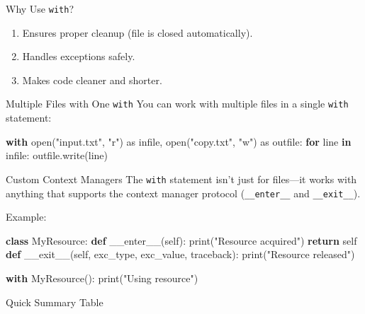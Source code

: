 \documentclass[
  letterpaper,
  DIV=11,
  numbers=noendperiod]{scrreprt}
\newenvironment{Shaded}{\begin{snugshade}}{\end{snugshade}}
\newcommand{\BuiltInTok}[1]{\textcolor[rgb]{0.00,0.23,0.31}{#1}}
\newcommand{\ControlFlowTok}[1]{\textcolor[rgb]{0.00,0.23,0.31}{\textbf{#1}}}
\newcommand{\FunctionTok}[1]{\textcolor[rgb]{0.28,0.35,0.67}{#1}}
\newcommand{\ImportTok}[1]{\textcolor[rgb]{0.00,0.46,0.62}{#1}}
\newcommand{\KeywordTok}[1]{\textcolor[rgb]{0.00,0.23,0.31}{\textbf{#1}}}
\newcommand{\NormalTok}[1]{\textcolor[rgb]{0.00,0.23,0.31}{#1}}
\newcommand{\StringTok}[1]{\textcolor[rgb]{0.13,0.47,0.30}{#1}}
\newcommand{\VariableTok}[1]{\textcolor[rgb]{0.07,0.07,0.07}{#1}}
\providecommand{\tightlist}{%
  \setlength{\itemsep}{0pt}\setlength{\parskip}{0pt}}
\begin{document}
Why Use \texttt{with}?

\begin{enumerate}
\def\labelenumi{\arabic{enumi}.}
\tightlist
\item
  Ensures proper cleanup (file is closed automatically).
\item
  Handles exceptions safely.
\item
  Makes code cleaner and shorter.
\end{enumerate}

Multiple Files with One \texttt{with} You can work with multiple files
in a single \texttt{with} statement:

\begin{Shaded}
\begin{Highlighting}[]
\ControlFlowTok{with} \BuiltInTok{open}\NormalTok{(}\StringTok{"input.txt"}\NormalTok{, }\StringTok{"r"}\NormalTok{) }\ImportTok{as}\NormalTok{ infile, }\BuiltInTok{open}\NormalTok{(}\StringTok{"copy.txt"}\NormalTok{, }\StringTok{"w"}\NormalTok{) }\ImportTok{as}\NormalTok{ outfile:}
    \ControlFlowTok{for}\NormalTok{ line }\KeywordTok{in}\NormalTok{ infile:}
\NormalTok{        outfile.write(line)}
\end{Highlighting}
\end{Shaded}

Custom Context Managers The \texttt{with} statement isn't just for
files---it works with anything that supports the context manager
protocol (\texttt{\_\_enter\_\_} and \texttt{\_\_exit\_\_}).

Example:

\begin{Shaded}
\begin{Highlighting}[]
\KeywordTok{class}\NormalTok{ MyResource:}
    \KeywordTok{def} \FunctionTok{\_\_enter\_\_}\NormalTok{(}\VariableTok{self}\NormalTok{):}
        \BuiltInTok{print}\NormalTok{(}\StringTok{"Resource acquired"}\NormalTok{)}
        \ControlFlowTok{return} \VariableTok{self}
    \KeywordTok{def} \FunctionTok{\_\_exit\_\_}\NormalTok{(}\VariableTok{self}\NormalTok{, exc\_type, exc\_value, traceback):}
        \BuiltInTok{print}\NormalTok{(}\StringTok{"Resource released"}\NormalTok{)}

\ControlFlowTok{with}\NormalTok{ MyResource():}
    \BuiltInTok{print}\NormalTok{(}\StringTok{"Using resource"}\NormalTok{)}
\end{Highlighting}
\end{Shaded}

Quick Summary Table
\end{document}
